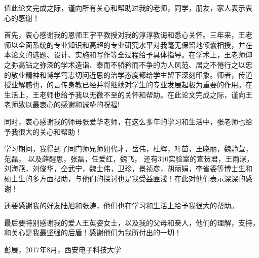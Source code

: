 
\begin{thanks}

值此论文完成之际，谨向所有关心和帮助过我的老师，同学，朋友，家人表示衷
心的感谢！

首先，衷心感谢我的恩师王宇平教授对我的淳淳教诲和悉心关怀。三年来，王老
师以全面系统的专业知识和高超的专业研究水平对我毫无保留地倾囊相授，并在
本论文的选题、设计、实施和写作等全过程给予具体指导。在学术上，王老师仰
之弥高钻之弥深的学术造诣、泰而不骄矜而不争的为人风范、居之不倦行之以忠
的敬业精神和博学笃志切问近思的治学态度都给学生留下深刻印象。师者，传道
授业解惑也，的言传身教已经并将继续对学生的专业发展起极为重要的作用。在
生活上，王老师也给予我以无微不至的关怀和帮助。在此论文完成之际，谨向王
老师致以最衷心的感谢和诚挚的祝福!

同时，衷心感谢我的师母张爱华老师，在这么多年的学习和生活中，张老师也给
予我很大的关心和帮助！

学习期间，我得到了同门师兄师姐代才，岳伟，杜辉，叶苗，王晓丽，魏静萱，
范磊， 以及薛醒思，张磊，任爱红，魏飞， 还有310实验室的宣贺君，王雨溕，
刘海燕，刘俊华，仝武宁，魏士伟，卫珍，景祯彦，胡丽娟，李省委等博士生和
硕士生的多方面帮助，与他们的探讨也是我受益匪浅！在此对他们表示深深的感
谢！

还要感谢我的好友陆旭和张涛，他们也在学习和生活上给予我很大的帮助。

最后要特别感谢我的爱人王英姿女士，以及我的父母和亲人，他们的理解，支持，
和关心是我最坚强的后盾！感谢他们为我所付出的一切！


彭展，2017年8月，西安电子科技大学

\end{thanks}
